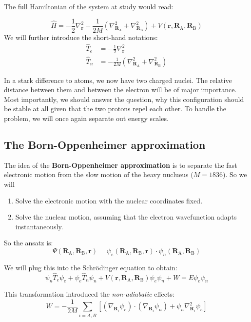 \documentclass[10pt]{article}
\newcommand{\vecRA}{\mathbf{R}_\mathrm{A}}
\newcommand{\vecRB}{\mathbf{R}_\mathrm{B}}
\begin{document}
The full Hamiltonian of the system at study would read:

\begin{equation}
\hat{H} = - \frac{1}{2}\nabla_\mathbf{r}^2 - \frac{1}{2M}\left(\nabla_{\vecRA}^2 +\nabla_{\vecRB}^2\right) + V(\mathbf{r}, \vecRA, \vecRB )
\end{equation}
We will further introduce the short-hand notations:
\begin{eqnarray}
\hat{T}_e &= - \frac{1}{2}\nabla_\mathbf{r}^2 \\
\hat{T}_n &= - \frac{1}{2M}\left(\nabla_{\vecRA}^2 +\nabla_{\vecRB}^2\right)
\end{eqnarray}

In a stark difference to atoms, we now have two charged nuclei. The relative distance between them and between the electron will be of major importance. Most importantly, we should answer the question, why this configuration should be stable at all given that the two protons repel each other. To handle the problem, we will once again separate out energy scales.

\subsection{The Born-Oppenheimer approximation}

The idea of the \textbf{Born-Oppenheimer approximation} is to separate the fast electronic motion from the slow motion of the heavy nuclueus ($M=1836$). So we will
\begin{enumerate}
\item Solve the electronic motion with the nuclear coordinates fixed.
\item Solve the nuclear motion, assuming that the electron wavefunction adapts instantaneously.
\end{enumerate}

So the ansatz is:
\begin{equation}
\Psi(\vecRA, \vecRB, \mathbf{r}) = \psi_e(\vecRA, \vecRB, \mathbf{r})\cdot \psi_n(\vecRA, \vecRB)
\end{equation}

We will plug this into the Schrödinger equation to obtain:
\begin{equation}
\psi_n\hat{T}_e\psi_e +\psi_e\hat{T}_n\psi_n + V(\mathbf{r}, \vecRA, \vecRB)\psi_e \psi_n + W = E \psi_e\psi_n
\end{equation}

This transformation introduced the \textit{non-adiabatic} effects:
\begin{equation}
W = -\frac{1}{2M}\sum_{i=A,B} \left[(\nabla_{\mathbf{R}_i}\psi_e)\cdot(\nabla_{\mathbf{R}_i}\psi_n)+\psi_n \nabla_{\mathbf{R}_i}^2 \psi_e\right]
\end{equation}
\end{document}
